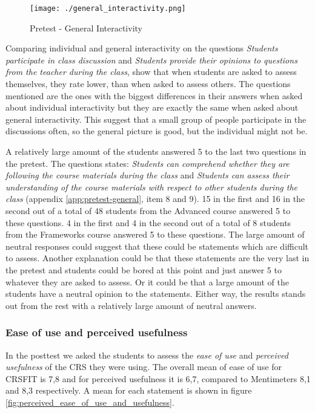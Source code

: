  \begin{figure}[H]
  \centering
     \texttt{[image: ./general\_interactivity.png]}
     \caption{Pretest - General Interactivity}
     \label{fig:general_interactivity}
 \end{figure}

Comparing individual and general interactivity on the questions \emph{Students participate in class discussion} and \emph{Students provide their opinions to questions from the teacher during the class}, show that when students are asked to assess themselves, they rate lower, than when asked to assess others. The questions mentioned are the ones with the biggest differences in their answers when asked about individual interactivity but they are exactly the same when asked about general interactivity. This suggest that a small group of people participate in the discussions often, so the general picture is good, but the individual might not be. 


A relatively large amount of the students answered 5 to the last two questions in the pretest. The questions states: \emph{Students can comprehend whether they are following the course materials during the class} and \emph{Students can assess their understanding of the course materials with respect to other students during the class} (appendix \ref{app:pretest-general}, item 8 and 9). 15 in the first and 16 in the second out of a total of 48 students from the Advanced course answered 5 to these questions. 4 in the first and 4 in the second out of a total of 8 students from the Frameworks course answered 5 to these questions. The large amount of neutral responses could suggest that these could be statements which are difficult to assess. Another explanation could be that these statements are the very last in the pretest and students could be bored at this point and just answer 5 to whatever they are asked to assess. Or it could be that a large amount of the students have a neutral opinion to the statements. Either way, the results stands out from the rest with a relatively large amount of neutral answers.


\subsubsection*{Ease of use and perceived usefulness}
In the posttest we asked the students to assess the \emph{ease of use} and \emph{perceived usefulness} of the CRS they were using. The overall mean of ease of use for CRSFIT is 7,8 and for perceived usefulness it is 6,7, compared to Mentimeters 8,1 and 8,3 respectively. A mean for each statement is shown in figure \ref{fig:perceived_ease_of_use_and_usefulness}.

